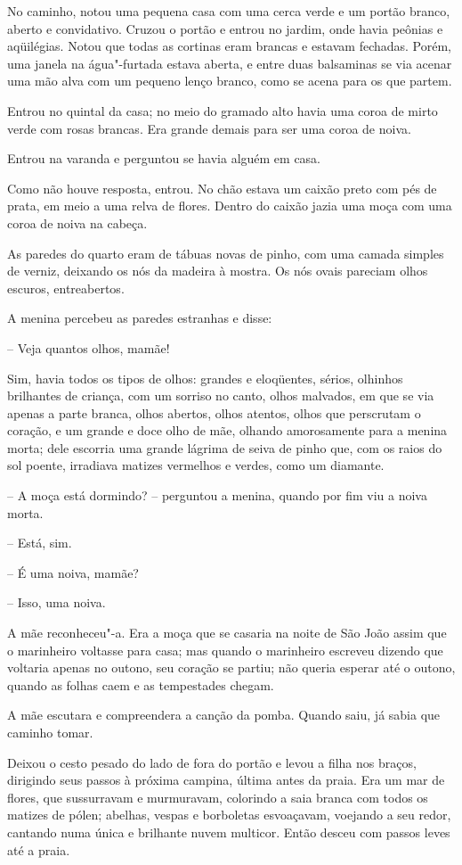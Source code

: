 No caminho, notou uma pequena casa com uma cerca verde e um portão
branco, aberto e convidativo. Cruzou o portão e entrou no jardim, onde
havia peônias e aqüilégias. Notou que todas as cortinas eram brancas e
estavam fechadas. Porém, uma janela na água"-furtada estava aberta, e
entre duas balsaminas se via acenar uma mão alva com um pequeno lenço
branco, como se acena para os que partem.

Entrou no quintal da casa; no meio do gramado alto havia uma coroa de
mirto verde com rosas brancas. Era grande demais para ser uma coroa de
noiva. 

Entrou na varanda e perguntou se havia alguém em casa. 

Como não houve resposta, entrou. No chão estava um caixão preto com pés
de prata, em meio a uma relva de flores. Dentro do caixão jazia uma
moça com uma coroa de noiva na cabeça.

As paredes do quarto eram de tábuas novas de pinho, com uma camada
simples de verniz, deixando os nós da madeira à mostra. Os nós ovais
pareciam olhos escuros, entreabertos. 

A menina percebeu as paredes estranhas e disse:  

-- Veja quantos olhos, mamãe!

Sim, havia todos os tipos de olhos: grandes e eloqüentes, sérios,
olhinhos brilhantes de criança, com um sorriso no canto, olhos
malvados, em que se via apenas a parte branca, olhos abertos, olhos
atentos, olhos que perscrutam o coração, e um grande e doce olho de
mãe, olhando amorosamente para a menina morta; dele escorria uma grande
lágrima de seiva de pinho que, com os raios do sol poente, irradiava
matizes vermelhos e verdes, como um diamante.

-- A moça está dormindo? -- perguntou a menina, quando por fim viu a noiva
morta.

-- Está, sim.

-- É uma noiva, mamãe?

-- Isso, uma noiva.

A mãe reconheceu"-a. Era a moça que se casaria na noite de São João
assim que o marinheiro voltasse para casa; mas quando o marinheiro
escreveu dizendo que voltaria apenas no outono, seu coração se partiu;
não queria esperar até o outono, quando as folhas caem e as tempestades
chegam. 

A mãe escutara e compreendera a canção da pomba.  Quando saiu, já sabia
que caminho tomar. 

Deixou o cesto pesado do lado de fora do portão e levou a filha nos
braços, dirigindo seus passos à próxima campina, última antes da praia.
Era um mar de flores, que sussurravam e murmuravam, colorindo a saia
branca com todos os matizes de pólen; abelhas, vespas e borboletas
esvoaçavam, voejando a seu redor, cantando numa única e brilhante nuvem
multicor. Então desceu com passos leves até a praia.

